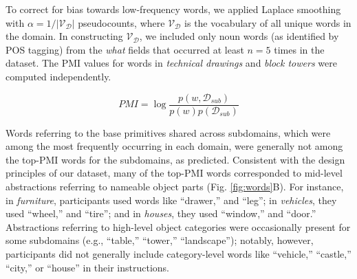 \documentclass[10pt,letterpaper]{article}
\begin{document}
To correct for bias towards low-frequency words, we applied Laplace smoothing with $\alpha=1/|\mathcal{V}_\mathcal{D}|$ pseudocounts, where $\mathcal{V}_\mathcal{D}$ is the vocabulary of all unique words in the domain. 
In constructing $\mathcal{V}_\mathcal{D}$, we included only noun words (as identified by POS tagging) from the \textit{what} fields that occurred at least $n=5$ times in the dataset. The PMI values for words in \textit{technical drawings} and \textit{block towers} were computed independently.

\begin{equation} \label{eq:pmi}
PMI = \log \dfrac{p(w, \mathcal{D}_{sub})}{p(w)p(\mathcal{D}_{sub})}
\end{equation}

Words referring to the base primitives shared across subdomains, which were among the most frequently occurring in each domain, were generally not among the top-PMI words for the subdomains, as predicted.
Consistent with the design principles of our dataset, many of the top-PMI words corresponded to mid-level abstractions referring to nameable object parts (Fig. \ref{fig:words}B). 
For instance, in \textit{furniture}, participants used words like ``drawer,'' and ``leg''; in \textit{vehicles}, they used ``wheel,'' and ``tire''; and in \textit{houses}, they used ``window,'' and ``door.''
Abstractions referring to high-level object categories were occasionally present for some subdomains (e.g., ``table,'' ``tower,'' ``landscape''); notably, however, participants did not generally include category-level words like ``vehicle,'' ``castle,'' ``city,'' or ``house'' in their instructions.
\end{document}
